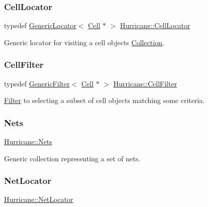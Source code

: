 \subsubsection{\texorpdfstring{Cell\+Locator}{CellLocator}}
{\footnotesize\ttfamily typedef \hyperlink{classHurricane_1_1GenericLocator}{Generic\+Locator}$<$ \hyperlink{classHurricane_1_1Cell}{Cell} $\ast$ $>$ \hyperlink{namespaceHurricane_abd99adab3b5944a4d1ace3d0b0b34f57}{Hurricane\+::\+Cell\+Locator}}

Generic locator for visiting a cell objects \hyperlink{classHurricane_1_1Collection}{Collection}. \mbox{\label{namespaceHurricane_addb0e9cd376680ecea4966516694b799}} 
\subsubsection{\texorpdfstring{Cell\+Filter}{CellFilter}}
{\footnotesize\ttfamily typedef \hyperlink{classHurricane_1_1GenericFilter}{Generic\+Filter}$<$ \hyperlink{classHurricane_1_1Cell}{Cell} $\ast$ $>$ \hyperlink{namespaceHurricane_addb0e9cd376680ecea4966516694b799}{Hurricane\+::\+Cell\+Filter}}

\hyperlink{classHurricane_1_1Filter}{Filter} to selecting a subset of cell objects matching some criteria. \mbox{\label{namespaceHurricane_a3404a8b17130a1824f4a281704b04df7}} 
\subsubsection{\texorpdfstring{Nets}{Nets}}
{\footnotesize\ttfamily \hyperlink{namespaceHurricane_a3404a8b17130a1824f4a281704b04df7}{Hurricane\+::\+Nets}}

Generic collection representing a set of nets. \mbox{\label{namespaceHurricane_a2911512d442f8332c3cd3a135332cc02}} 
\subsubsection{\texorpdfstring{Net\+Locator}{NetLocator}}
{\footnotesize\ttfamily \hyperlink{namespaceHurricane_a2911512d442f8332c3cd3a135332cc02}{Hurricane\+::\+Net\+Locator}}

